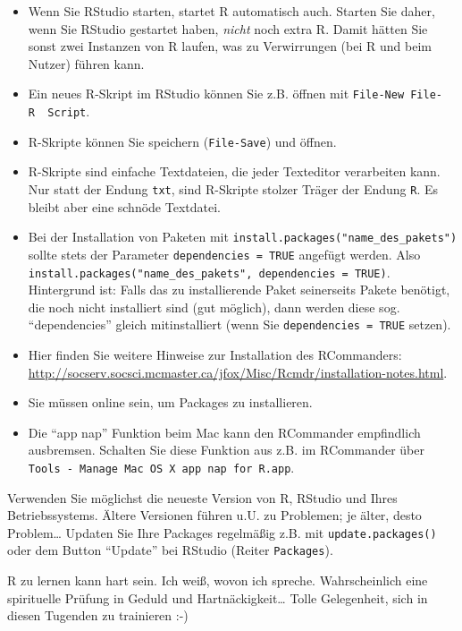 \documentclass[12pt,]{book}
\begin{document}
\begin{itemize}
\item
  Wenn Sie RStudio starten, startet R automatisch auch. Starten Sie
  daher, wenn Sie RStudio gestartet haben, \emph{nicht} noch extra R.
  Damit hätten Sie sonst zwei Instanzen von R laufen, was zu
  Verwirrungen (bei R und beim Nutzer) führen kann.
\item
  Ein neues R-Skript im RStudio können Sie z.B. öffnen mit
  \texttt{File-New\ File-R\ \ Script}.
\item
  R-Skripte können Sie speichern (\texttt{File-Save}) und öffnen.
\item
  R-Skripte sind einfache Textdateien, die jeder Texteditor verarbeiten
  kann. Nur statt der Endung \texttt{txt}, sind R-Skripte stolzer Träger
  der Endung \texttt{R}. Es bleibt aber eine schnöde Textdatei.
\item
  Bei der Installation von Paketen mit
  \texttt{install.packages("name\_des\_pakets")} sollte stets der
  Parameter \texttt{dependencies\ =\ TRUE} angefügt werden. Also
  \texttt{install.packages("name\_des\_pakets",\ dependencies\ =\ TRUE)}.
  Hintergrund ist: Falls das zu installierende Paket seinerseits Pakete
  benötigt, die noch nicht installiert sind (gut möglich), dann werden
  diese sog. ``dependencies'' gleich mitinstalliert (wenn Sie
  \texttt{dependencies\ =\ TRUE} setzen).
\item
  Hier finden Sie weitere Hinweise zur Installation des RCommanders:
  \url{http://socserv.socsci.mcmaster.ca/jfox/Misc/Rcmdr/installation-notes.html}.
\item
  Sie müssen online sein, um Packages zu installieren.
\item
  Die ``app nap'' Funktion beim Mac kann den RCommander empfindlich
  ausbremsen. Schalten Sie diese Funktion aus z.B. im RCommander über
  \texttt{Tools\ -\ Manage\ Mac\ OS\ X\ app\ nap\ for\ R.app}.
\end{itemize}

Verwenden Sie möglichst die neueste Version von R, RStudio und Ihres
Betriebssystems. Ältere Versionen führen u.U. zu Problemen; je älter,
desto Problem\ldots{} Updaten Sie Ihre Packages regelmäßig z.B. mit
\texttt{update.packages()} oder dem Button ``Update'' bei RStudio
(Reiter \texttt{Packages}).

R zu lernen kann hart sein. Ich weiß, wovon ich spreche. Wahrscheinlich
eine spirituelle Prüfung in Geduld und Hartnäckigkeit\ldots{} Tolle
Gelegenheit, sich in diesen Tugenden zu trainieren :-)
\end{document}

